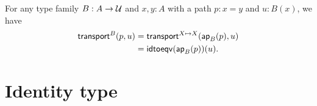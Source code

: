 \documentclass[hott-all.tex]{subfiles}
\begin{document}
%
%
\begin{lem}\label{thm:transport-is-ap}
  For any type family $B:A\to\mathcal{U}$ and $x,y:A$ with a path $p:x=y$ and $u:B(x)$, we have
  \begin{align*}
    \mathsf{transport}^{B}(p,u) &= \mathsf{transport}^{X\mapsto X}(\mathsf{ap}_{B}(p),u)\\
    &= \mathsf{idtoeqv}(\mathsf{ap}_{B}(p))(u).
  \end{align*}
\end{lem}
%
%
\section{Identity type}
\label{sec:compute-paths}
\end{document}
